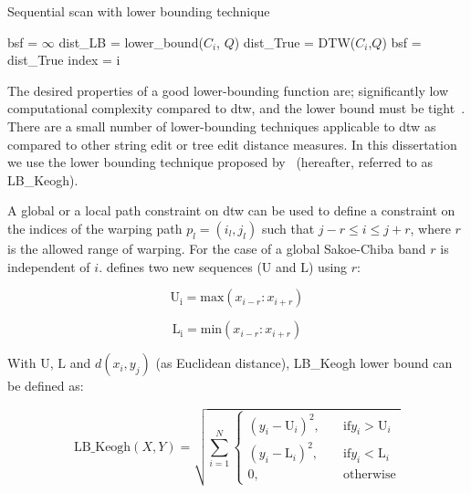 \begin{algorithm}
	\caption{Sequential scan with lower bounding technique}
	\label{alg:sequential_scan_lower_bound}
	\begin{algorithmic}
		\State bsf = $\infty$	
			\State dist\_LB = lower\_bound($C_i$, $Q$)
				\State dist\_True = DTW($C_i$,$Q$)	
					\State bsf = dist\_True
					\State index = i 
				\EndIf
			\EndIf
		
		\EndFor
		
	\end{algorithmic}
\end{algorithm}

The desired properties of a good lower-bounding function are; significantly low computational complexity compared to \gls{dtw}, and the lower bound must be tight~\citep{Keogh2004}. There are a small number of lower-bounding techniques applicable to \gls{dtw} as compared to other string edit or tree edit distance measures. In this dissertation we use the lower bounding technique proposed by~\cite{Keogh2004} (hereafter, referred to as LB\_Keogh). 

A global or a local path constraint on \gls{dtw} can be used to define a constraint on the indices of the warping path $p_l = (i_l, j_l)$ such that $j-r \leq i \leq j+r$, where $r$ is the allowed range of warping. For the case of a global Sakoe-Chiba band $r$ is independent of $i$. \cite{Keogh2004} defines two new sequences ($\mathrm{U}$ and $\mathrm{L}$) using $r$:

\begin{equation}
	\mathrm{U_i} = \mathrm{max}(x_{i-r}:x_{i+r})
\end{equation}

\begin{equation}
\mathrm{\mathrm{L}_i} = \mathrm{min}(x_{i-r}:x_{i+r})
\end{equation}

With $\mathrm{U}$, $\mathrm{L}$ and $d(x_i, y_j)$ (as Euclidean distance), LB\_Keogh lower bound can be defined as:

\begin{equation}
	\mathrm{LB\_Keogh}(X,Y) = \sqrt{\sum_{i=1}^{N}{\begin{cases}
			(y_i - \mathrm{U}_i)^2, & \quad \text{if} y_i > \mathrm{U}_i\\
			(y_i - \mathrm{L}_i)^2, & \quad \text{if} y_i < \mathrm{L}_i\\			
			0, & \quad \mathrm{otherwise}			
			\end{cases}}}
\end{equation}


